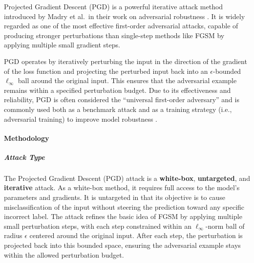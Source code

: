 \documentclass[../main.tex]{subfiles}
\begin{document}
Projected Gradient Descent (PGD) is a powerful iterative attack method introduced by Madry et al.\ in their work on adversarial robustness \cite{madry2018towardspgd}. It is widely regarded as one of the most effective first-order adversarial attacks, capable of producing stronger perturbations than single-step methods like FGSM by applying multiple small gradient steps.

PGD operates by iteratively perturbing the input in the direction of the gradient of the loss function and projecting the perturbed input back into an $\epsilon$-bounded $\ell_\infty$ ball around the original input. This ensures that the adversarial example remains within a specified perturbation budget. Due to its effectiveness and reliability, PGD is often considered the “universal first-order adversary” and is commonly used both as a benchmark attack and as a training strategy (i.e., adversarial training) to improve model robustness \cite{madry2018towardspgd}.

\paragraph{Methodology}

\subparagraph{Attack Type}
The Projected Gradient Descent (PGD) attack is a \textbf{white-box}, \textbf{untargeted}, and \textbf{iterative} attack. As a white-box method, it requires full access to the model’s parameters and gradients. It is untargeted in that its objective is to cause misclassification of the input without steering the prediction toward any specific incorrect label. The attack refines the basic idea of FGSM by applying multiple small perturbation steps, with each step constrained within an $\ell_\infty$-norm ball of radius $\epsilon$ centered around the original input. After each step, the perturbation is projected back into this bounded space, ensuring the adversarial example stays within the allowed perturbation budget.
\end{document}
